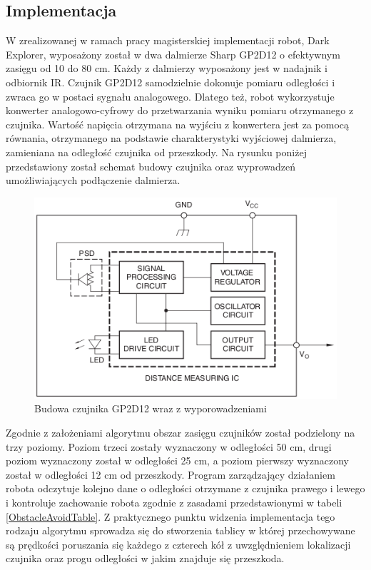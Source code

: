 \subsection{Implementacja}
W zrealizowanej w ramach pracy magisterskiej implementacji robot, Dark Explorer,
wyposażony został w dwa dalmierze Sharp GP2D12 o efektywnym zasięgu od 10 do 80
cm. Każdy z dalmierzy wyposażony jest w nadajnik i odbiornik IR. Czujnik
GP2D12 samodzielnie dokonuje pomiaru odległości i zwraca go w postaci sygnału
analogowego. Dlatego też, robot wykorzystuje konwerter analogowo-cyfrowy do
przetwarzania wyniku pomiaru otrzymanego z czujnika. Wartość napięcia otrzymana
na wyjściu z konwertera jest za pomocą równania, otrzymanego na podstawie
charakterystyki wyjściowej dalmierza, zamieniana na odległość czujnika od
przeszkody. Na rysunku poniżej przedstawiony został schemat budowy czujnika oraz
wyprowadzeń umożliwiających podłączenie dalmierza.

\begin{figure}[hb]
 \centering
 \includegraphics[width=150mm]{../images/ch04/gp2d12_build.png}
 \caption{Budowa czujnika GP2D12 wraz z wyporowadzeniami\cite{GP2D12DataSheet}}
 \label{fig:SharpGP2D12}
\end{figure}

Zgodnie z założeniami algorytmu obszar zasięgu czujników został podzielony na
trzy poziomy. Poziom trzeci zostały wyznaczony w odległości 50 cm, drugi poziom
wyznaczony został w odległości 25 cm, a poziom pierwszy wyznaczony został w
odległości 12 cm od przeszkody. Program zarządzający działaniem robota odczytuje
kolejno dane o odległości otrzymane z czujnika prawego i lewego i kontroluje
zachowanie robota zgodnie z zasadami przedstawionymi w tabeli \ref{ObstacleAvoidTable}.
Z praktycznego punktu widzenia implementacja tego rodzaju algorytmu sprowadza
się do stworzenia tablicy w której przechowywane są prędkości poruszania się każdego z
czterech kół z uwzględnieniem lokalizacji czujnika oraz progu odległości w jakim
znajduje się przeszkoda. 
